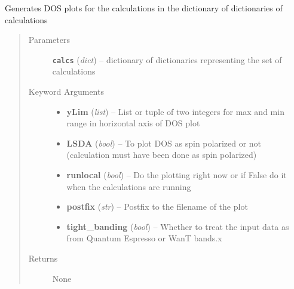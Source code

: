 \documentclass[letterpaper,10pt,english]{sphinxmanual}
\begin{document}

\begin{fulllineitems}
\label{plot:plot.dos}
Generates DOS plots for the calculations in the dictionary of dictionaries of calculations
\begin{quote}\begin{description}
\item[{Parameters}] \leavevmode
\textbf{\texttt{calcs}} (\emph{dict}) -- dictionary of dictionaries representing the set of calculations

\item[{Keyword Arguments}] \leavevmode\begin{itemize}
\item {} 
\textbf{yLim} (\emph{list}) --
List or tuple of two integers for max and min range in horizontal axis of DOS plot

\item {} 
\textbf{LSDA} (\emph{bool}) --
To plot DOS as spin polarized or not (calculation must have been done as spin polarized)

\item {} 
\textbf{runlocal} (\emph{bool}) --
Do the plotting right now or if False do it when the calculations are running

\item {} 
\textbf{postfix} (\emph{str}) --
Postfix to the filename of the plot

\item {} 
\textbf{tight\_banding} (\emph{bool}) --
Whether to treat the input data as from Quantum Espresso or WanT bands.x

\end{itemize}

\item[{Returns}] \leavevmode
None

\end{description}\end{quote}

\end{fulllineitems}


\begin{fulllineitems}
\label{plot:plot.grid_plot}
\end{fulllineitems}
\end{document}
